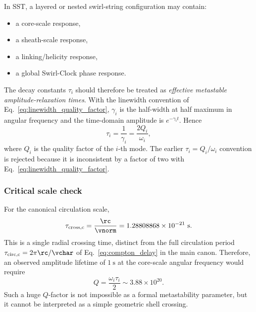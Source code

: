         In SST, a layered or nested swirl-string configuration may contain:
        \begin{itemize}
            \item a core-scale response,
            \item a sheath-scale response,
            \item a linking/helicity response,
            \item a global Swirl-Clock phase response.
        \end{itemize}
        The decay constants \(\tau_i\) should therefore be treated as
        \emph{effective metastable amplitude-relaxation times}.  With the linewidth
        convention of Eq.~\eqref{eq:linewidth_quality_factor},
        \(\gamma_i\) is the half-width at half maximum in angular frequency and the
        time-domain amplitude is \(e^{-\gamma_i t}\).  Hence
        \begin{equation}
            \boxed{
                \tau_i
                =
                \frac{1}{\gamma_i}
                =
                \frac{2Q_i}{\omega_i}
            },
            \label{eq:tau_Q_over_omega}
        \end{equation}
        where \(Q_i\) is the quality factor of the \(i\)-th mode.  The earlier
        \(\tau_i=Q_i/\omega_i\) convention is rejected because it is inconsistent by a
        factor of two with Eq.~\eqref{eq:linewidth_quality_factor}.
    
    \subsubsection*{Critical scale check}
        
        For the canonical circulation scale,
        \begin{equation}
            \tau_{\rm cross,c}
            =
            \frac{\rc}{\vnorm}
            =
            1.28808868\times10^{-21}\ \mathrm{s}.
            \label{eq:core_crossing_time_numeric}
        \end{equation}
        This is a single radial crossing time, distinct from the full circulation
        period \(\tau_{\rm circ,c}=2\pi\rc/\vchar\) of Eq.~\eqref{eq:compton_delay}
        in the main canon.
        Therefore, an observed amplitude lifetime of \(1\ \mathrm{s}\) at the
        core-scale angular frequency would require
        \begin{equation}
            Q
            =
            \frac{\omega_i\tau_i}{2}
            \sim
            3.88\times10^{20}.
            \label{eq:large_Q_warning}
        \end{equation}
        Such a huge \(Q\)-factor is not impossible as a formal metastability parameter, but it cannot be interpreted as a simple geometric shell crossing.
    
